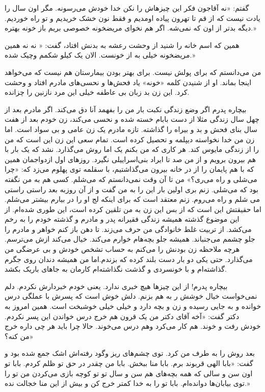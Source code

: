 \documentclass[12pt,a4paper]{book}
\begin{document}
گفتم: «نه آقاجون فکر این چیزهاش را نکن خدا خودش می‌رسونه. مگر اون سال را یادت نیست که از قم تا تهرون پیاده اومدیم و فقط نون خشک خریدیم و تو راه خوردیم. دیگه بدتر از اون که نمی‌شه. اگر هم نخوای مریضخونه خصوصی بریم باز خونه بهتره.»

همین که اسم خانه را شنید از وحشت رعشه به بدنش افتاد، گفت: « نه نه  همین مریضخونه خیلی به از خونست. الان یک کیلو شکمم وچیک شده.»

من می‌دانستم که برای پولش نیست. برای بهتر بودن بیمارستان هم نیست که می‌خواهد اینجا بماند. او از شنیدن کلمه «خونه» یاد فحش‌ها و نحسی‌های مادرم افتاد و وحشت کرد. این زن بد زبان بی عاطفه خیلی این مرد نازنین را چزانده.

بیچاره پدرم اگر وضع زندگی نکبت بار من را بفهمد آنا دق می‌کند. اگر مادرم بعد از چهل سال زندگی مثلا از دست بابام خسته شده و نحسی می‌کند، زن خودم بعد از هفت سال بنای فحش و بد و بیراه را گذاشته. تازه مادرم یک زن عامی و بی سواد است. اما زن من خدا نخواسته دیپلمه و تحصیل کرده است. تمام سعی این زن این است که من را از زندگی مایوس کند. هر کاری که من بکنم یک اما روش می‌گذارد. نشد که یک بار با هم بیرون برویم و از من صد تا ایراد بنی‌اسراییلی نگیرد. روزهای اول ازدواجمان همین که با هم پایمان را از در خانه بیرون می‌گذاشتیم، با سقلمه توی پهلوم می‌زد که: «چرا می‌شلی و راه می‌ری؟» من تا آن وقت نمی‌دانستم که می‌شلم. کسی هم به من نگفته بود که می‌شلی. زنم بری اولین بار این را به من گفت و از آن روزبه بعد راستی راستی می شلم و راه می‌روم. زنم معتقد است که برای اینکه لج او را در بیارم بیشتر می‌شلم. اما حقیقتش این است که از بس این زن به من تلقین کرده است، این طوری شده‌ام. از این موضوع گذشته همیشه زندگی فقیرانه پدر و مادرم و گذشته خودم را به رخم می‌کشد. از تربیت غلط خانوادگی من حرف می‌زند. تا دهن باز کنم خواهر و مادرم را جلو چشمم می‌جنباند. همیشه جلو بچه‌هام خوارم می‌کند. خیال می‌کند ازش می‌ترسم. هرچه ملاحظه زن بودنش را می‌کنم به حساب تشخص خودش و بی عرضگی من می‌گذارد. حتی یکی دو بار دست بلند کرده که بزندم.اما من همیشه دندان روی جگرم گذاشته‌ام و با خونسردی و گذشت نگذاشته‌ام کارمان به جاهای باریک بکشد.

بیچاره پدرم! از این چیزها هیچ خبری ندارد. یعنی خودم خبردارش نکردم. دلم نمی‌خواست خیال خوشش ر به هم بزنم. دلش خوش است که پسرش با عملگی درس خوانده و به جایی رسیده و زن و بچه دارد و خیلی خیلی خوشبخت است. همین امروز به دکتر گفت: «آخه آقای دکتر من یک قرون هم خرج درس خواندن این پسر نکردم. خودش رفت و خوند. هم کار می‌کرد وهم درس می‌خوند. حالا چرا باید هر چی داره خرج من کنه؟»

بعد روش را به طرف من کرد. توی چشم‌های ریز وگود رفته‌اش اشک جمع شده بود و گفت: «بابا الهی قربوند برم. بابا منا ببخش. بابا من چقدر در حق تو ظلم کردم. بابا تو اون سن و سالی که همه بچه‌های هم سن و سال تو تو کوچه بازی می‌کردن من تو را توی بیابان‌ها دوانده‌ام. بابا تو را به خدا کمتر خرج کن و بیش از این منا خجالت نده.»
\end{document}
